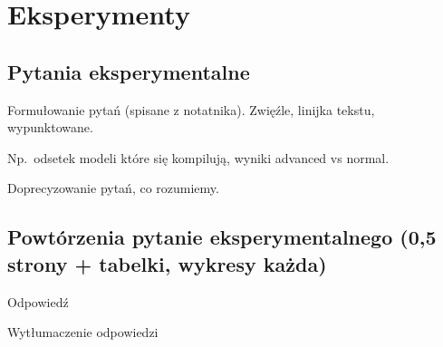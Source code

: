 
\chapter{Eksperymenty}

\section{Pytania eksperymentalne}
Formułowanie pytań (spisane z notatnika). Zwięźle, linijka tekstu, wypunktowane. 

Np.~odsetek modeli które się kompilują, wyniki advanced vs normal. 

Doprecyzowanie pytań, co rozumiemy.

\section{Powtórzenia pytanie eksperymentalnego (0,5 strony + tabelki, wykresy każda)}
Odpowiedź

Wytłumaczenie odpowiedzi
